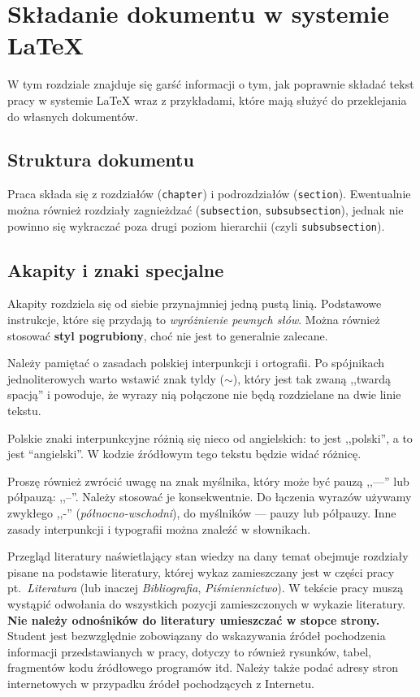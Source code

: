 
\chapter{Składanie dokumentu w systemie \LaTeX}

W tym rozdziale znajduje się
garść informacji o tym, jak poprawnie składać tekst pracy w systemie \LaTeX{} wraz z 
przykładami, które mają służyć do przeklejania do własnych dokumentów.

\section{Struktura dokumentu}

Praca składa się z rozdziałów (\texttt{chapter}) i podrozdziałów (\texttt{section}).
Ewentualnie można również rozdziały zagnieżdzać (\texttt{subsection}, \texttt{subsubsection}),
jednak nie powinno się wykraczać poza drugi poziom hierarchii (czyli \texttt{subsubsection}).

\section{Akapity i znaki specjalne}

Akapity rozdziela się od siebie przynajmniej jedną pustą linią. Podstawowe
instrukcje, które się przydają to \emph{wyróżnienie pewnych słów}. Można również
stosować \textbf{styl pogrubiony}, choć nie jest to generalnie zalecane.

Należy pamiętać o zasadach polskiej interpunkcji i ortografii. Po spójnikach 
jednoliterowych warto wstawić znak tyldy ($\sim$), który jest tak zwaną
,,twardą spacją'' i powoduje, że wyrazy nią połączone nie będą rozdzielane
na dwie linie tekstu.

Polskie znaki interpunkcyjne różnią się nieco od angielskich: to jest ,,polski'', a to jest
``angielski''. W kodzie źródłowym tego tekstu będzie widać różnicę.

Proszę również zwrócić uwagę na znak myślnika, który może być pauzą ,,---'' lub
półpauzą: ,,--''. Należy stosować je konsekwentnie. Do łączenia wyrazów używamy
zwykłego ,,-'' (\emph{północno-wschodni}), do myślników --- pauzy lub półpauzy.
Inne zasady interpunkcji i typografii można znaleźć w słownikach.

Przegląd literatury naświetlający stan wiedzy na dany temat obejmuje rozdziały pisane na podstawie
literatury, której wykaz zamieszczany jest w części pracy pt.~\emph{Literatura} (lub inaczej \emph{Bibliografia},
\emph{Piśmiennictwo}). W tekście pracy muszą wystąpić odwołania do wszystkich pozycji zamieszczonych w
wykazie literatury. \textbf{Nie należy odnośników do literatury umieszczać w stopce strony.} Student jest
bezwzględnie zobowiązany do wskazywania źródeł pochodzenia informacji przedstawianych w pracy,
dotyczy to również rysunków, tabel, fragmentów kodu źródłowego programów itd. Należy także podać
adresy stron internetowych w przypadku źródeł pochodzących z Internetu.

